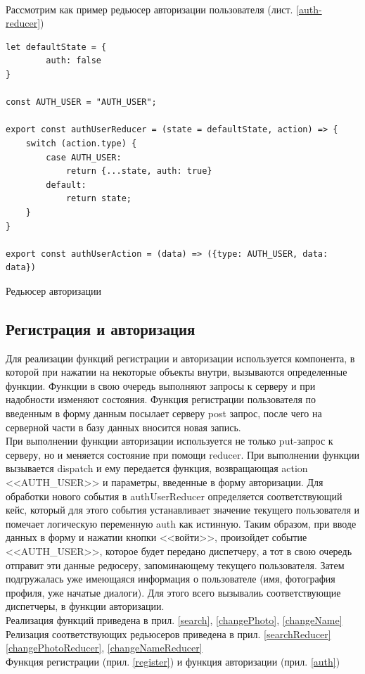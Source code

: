 \documentclass[14pt,final]{report}
\begin{document}
\\
Рассмотрим как пример редьюсер авторизации пользователя (лист. \ref{auth-reducer})
\newpage
\begin{listing}[!h]
\begin{verbatim}
let defaultState = {
        auth: false
}

const AUTH_USER = "AUTH_USER";

export const authUserReducer = (state = defaultState, action) => {
    switch (action.type) {
        case AUTH_USER:
            return {...state, auth: true}
        default:
            return state;
    }
}

export const authUserAction = (data) => ({type: AUTH_USER, data: data})
\end{verbatim}
\caption{Редьюсер авторизации}
\label{auth-reducer}
\end{listing}

\subsection{Регистрация и авторизация}
Для реализации функций регистрации и авторизации используется компонента, в которой при нажатии на некоторые объекты внутри, вызываются определенные функции.
Функции в свою очередь выполняют запросы к серверу и при надобности изменяют состояния.
Функция регистрации пользователя по введенным в форму данным посылает серверу post запрос, после чего на серверной части в базу данных вносится новая запись.\\
При выполнении функции авторизации используется не только put-запрос к серверу, но и
меняется состояние при помощи reducer. При выполнении функции вызывается dispatch
и ему передается функция, возвращающая action <<AUTH\_USER>> и параметры, введенные в форму
авторизации. Для обработки нового события в authUserReducer определяется соответствующий кейс, который для этого события устанавливает значение текущего пользователя и помечает логическую переменную auth как истинную. Таким образом, при вводе данных в форму и нажатии кнопки <<войти>>, произойдет событие <<AUTH\_USER>>, которое будет передано диспетчеру, а тот в свою очередь отправит эти данные редюсеру, запоминающему текущего пользователя.
Затем подгружалась уже имеющаяся информация о пользователе (имя, фотография профиля, уже начатые диалоги). Для этого всего вызывалиь соответствующие диспетчеры, в функции авторизации.\\
Реализация функций приведена в прил. \ref{search}, \ref{changePhoto}, \ref{changeName}\\
Релизация соответствующих редьюсеров приведена в прил. \ref{searchReducer}\\ \ref{changePhotoReducer}, \ref{changeNameReducer}\\
Функция регистрации (прил. \ref{register}) и функция авторизации (прил. \ref{auth})
\end{document}
